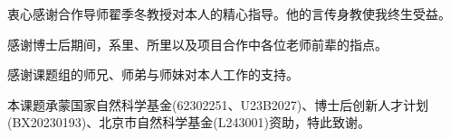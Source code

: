 
\begin{acknowledgements}
  衷心感谢合作导师翟季冬教授对本人的精心指导。他的言传身教使我终生受益。

  感谢博士后期间，系里、所里以及项目合作中各位老师前辈的指点。

  感谢课题组的师兄、师弟与师妹对本人工作的支持。





  本课题承蒙国家自然科学基金(62302251、U23B2027)、博士后创新人才计划(BX20230193)、北京市自然科学基金(L243001)资助，特此致谢。
\end{acknowledgements}
